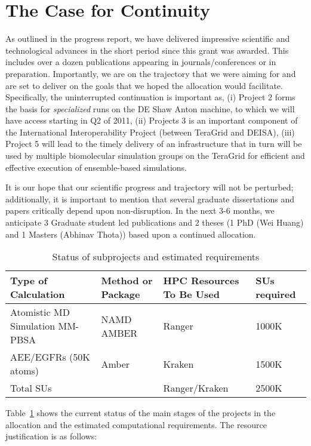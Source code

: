 \documentclass[a4paper,10pt]{article}
\begin{document}
\section{The Case for Continuity}

As outlined in the progress report, we have delivered impressive scientific and technological advances in the short period since this grant was awarded. This includes over a dozen publications appearing in journals/conferences or in preparation. Importantly, we are on the trajectory that we were aiming for and are set to deliver on the goals that we hoped the allocation would facilitate.  Specifically, the uninterrupted continuation is important as, (i) Project 2 forms the basis for {\it specialized} runs on the DE Shaw Anton machine, to which we will have access starting in Q2 of 2011, (ii) Projects 3 is an important component of the International Interoperability Project (between TeraGrid and DEISA), (iii) Project 5 will lead to the timely delivery of an infrastructure that in turn will be used by multiple biomolecular simulation groups on the TeraGrid for efficient and effective execution of ensemble-based simulations.

It is our hope that our scientific progress and trajectory will not be perturbed; additionally, it is important to mention that several graduate dissertations and papers critically depend upon non-disruption. In the next 3-6 months, we anticipate 3 Graduate student led publications and 2 theses (1 PhD (Wei Huang) and 1 Masters (Abhinav Thota)) based upon a continued allocation.

\begin{table}
\caption{Status of subprojects and estimated requirements}
\label{table:tab1}
\begin{tabular}{ |  p{5cm} | l | l | l |}
\hline
Type of Calculation & Method or Package & HPC Resources To Be Used & SUs required\\ \hline \hline
Atomistic MD Simulation MM-PBSA & NAMD AMBER & Ranger & 1000K\\ \hline
AEE/EGFRs (50K atoms) & Amber & Kraken & 1500K\\ \hline
Total SUs  &   & Ranger/Kraken & 2500K \\ \hline
\end{tabular}
\end{table}

Table~\ref{table:tab1} shows the current status of the main stages of the projects in the allocation and the estimated computational requirements. The resource justification is as follows:
\end{document}
